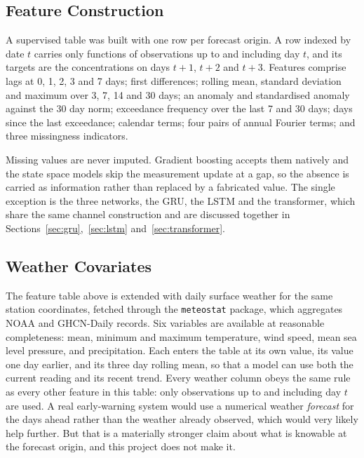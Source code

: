 \documentclass[12pt,a4paper]{report}
\begin{document}
\subsection{Feature Construction}
\label{sec:features}

A supervised table was built with one row per forecast origin. A row indexed by
date $t$ carries only functions of observations up to and including day $t$, and
its targets are the concentrations on days $t+1$, $t+2$ and $t+3$. Features
comprise lags at 0, 1, 2, 3 and 7 days; first differences; rolling mean, standard
deviation and maximum over 3, 7, 14 and 30 days; an anomaly and standardised
anomaly against the 30 day norm; exceedance frequency over the last 7 and 30
days; days since the last exceedance; calendar terms; four pairs of annual
Fourier terms; and three missingness indicators.

Missing values are never imputed. Gradient boosting accepts them natively and the
state space models skip the measurement update at a gap, so the absence is
carried as information rather than replaced by a fabricated value. The single
exception is the three networks, the GRU, the LSTM and the transformer, which share the
same channel construction and are discussed together in
Sections~\ref{sec:gru},~\ref{sec:lstm} and~\ref{sec:transformer}.

\subsection{Weather Covariates}
\label{sec:weather}

The feature table above is extended with daily surface weather for the same
station coordinates, fetched through the \texttt{meteostat} package, which
aggregates NOAA and GHCN-Daily records. Six variables are available at
reasonable completeness: mean, minimum and maximum temperature, wind speed,
mean sea level pressure, and precipitation. Each enters the table at its own
value, its value one day earlier, and its three day rolling mean, so that a
model can use both the current reading and its recent trend. Every weather
column obeys the same rule as every other feature in this table: only
observations up to and including day $t$ are used. A real early-warning
system would use a numerical weather \emph{forecast} for the days ahead
rather than the weather already observed, which would very likely help
further. But that is a materially stronger claim about what is knowable at
the forecast origin, and this project does not make it.
\end{document}
